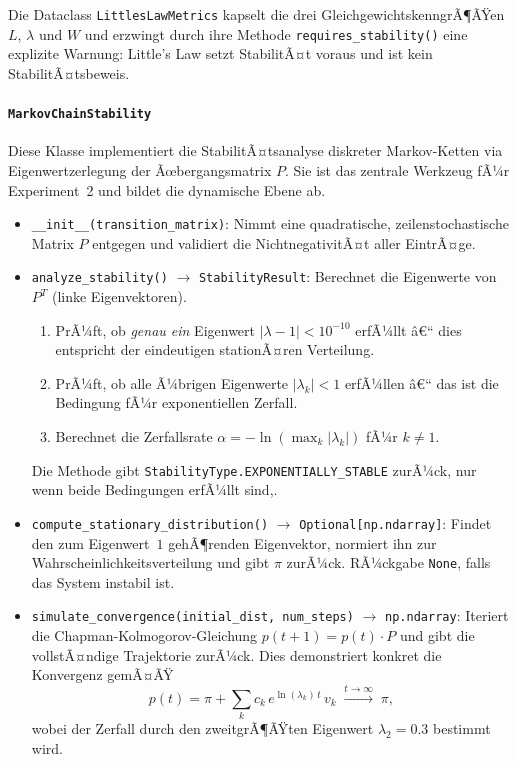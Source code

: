 ﻿\documentclass[a4paper,12pt]{report}
\theoremstyle{definition}
\begin{document}
Die Dataclass \texttt{LittlesLawMetrics} kapselt die drei
GleichgewichtskenngrÃ¶ÃŸen $L$, $\lambda$ und $W$ und erzwingt durch
ihre Methode \texttt{requires\_stability()} eine explizite Warnung:
Little's Law setzt StabilitÃ¤t voraus und ist kein StabilitÃ¤tsbeweis.

\paragraph{\texttt{MarkovChainStability}}

Diese Klasse implementiert die StabilitÃ¤tsanalyse diskreter
Markov-Ketten via Eigenwertzerlegung der Ãœbergangsmatrix $P$.  Sie
ist das zentrale Werkzeug fÃ¼r Experiment~2 und bildet die dynamische
Ebene ab.

\begin{itemize}
	\item \texttt{\_\_init\_\_(transition\_matrix)}: Nimmt eine
	quadratische, zeilenstochastische Matrix $P$ entgegen und
	validiert die NichtnegativitÃ¤t aller EintrÃ¤ge.
	
	\item \texttt{analyze\_stability()} $\to$ \texttt{StabilityResult}:
	Berechnet die Eigenwerte von $P^T$ (linke Eigenvektoren).
	\begin{enumerate}
		\item PrÃ¼ft, ob \emph{genau ein} Eigenwert
		$|\lambda - 1| < 10^{-10}$ erfÃ¼llt â€“ dies
		entspricht der eindeutigen stationÃ¤ren Verteilung.
		\item PrÃ¼ft, ob alle Ã¼brigen Eigenwerte $|\lambda_k| < 1$
		erfÃ¼llen â€“ das ist die Bedingung fÃ¼r exponentiellen
		Zerfall.
		\item Berechnet die Zerfallsrate
		$\alpha = -\ln(\max_k |\lambda_k|)$ fÃ¼r $k \neq 1$.
	\end{enumerate}
	Die Methode gibt \texttt{StabilityType.EXPONENTIALLY\_STABLE} zurÃ¼ck, nur wenn beide Bedingungen erfÃ¼llt sind,.
	
	\item \texttt{compute\_stationary\_distribution()} $\to$
	\texttt{Optional[np.ndarray]}:  Findet den zum Eigenwert~$1$
	gehÃ¶renden Eigenvektor, normiert ihn zur
	Wahrscheinlichkeitsverteilung und gibt $\pi$ zurÃ¼ck.
	RÃ¼ckgabe \texttt{None}, falls das System instabil ist.
	
	\item \texttt{simulate\_convergence(initial\_dist, num\_steps)}
	$\to$ \texttt{np.ndarray}:  Iteriert die
	Chapman-Kolmogorov-Gleichung $p(t+1) = p(t) \cdot P$ und
	gibt die vollstÃ¤ndige Trajektorie zurÃ¼ck.  Dies demonstriert
	konkret die Konvergenz gemÃ¤ÃŸ
	\[
	p(t) = \pi + \sum_{k} c_k\, e^{\ln(\lambda_k)\,t}\, v_k
	\;\xrightarrow{t\to\infty}\; \pi,
	\]
	wobei der Zerfall durch den zweitgrÃ¶ÃŸten Eigenwert
	$\lambda_2 = 0.3$ bestimmt wird.
\end{itemize}
\end{document}
